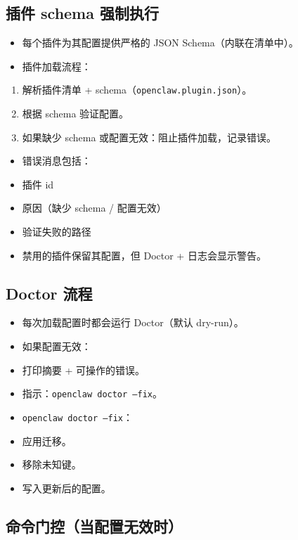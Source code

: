\subsection{插件 schema 强制执行}


\begin{itemize}
  \item 每个插件为其配置提供严格的 JSON Schema（内联在清单中）。
  \item 插件加载流程：
\end{itemize}

\begin{enumerate}
  \item 解析插件清单 + schema（\texttt{openclaw.plugin.json}）。
  \item 根据 schema 验证配置。
  \item 如果缺少 schema 或配置无效：阻止插件加载，记录错误。
\end{enumerate}

\begin{itemize}
  \item 错误消息包括：
  \item 插件 id
  \item 原因（缺少 schema / 配置无效）
  \item 验证失败的路径
  \item 禁用的插件保留其配置，但 Doctor + 日志会显示警告。
\end{itemize}


\subsection{Doctor 流程}


\begin{itemize}
  \item 每次加载配置时都会运行 Doctor（默认 dry-run）。
  \item 如果配置无效：
  \item 打印摘要 + 可操作的错误。
  \item 指示：\texttt{openclaw doctor --fix}。
  \item \texttt{openclaw doctor --fix}：
  \item 应用迁移。
  \item 移除未知键。
  \item 写入更新后的配置。
\end{itemize}


\subsection{命令门控（当配置无效时）}


